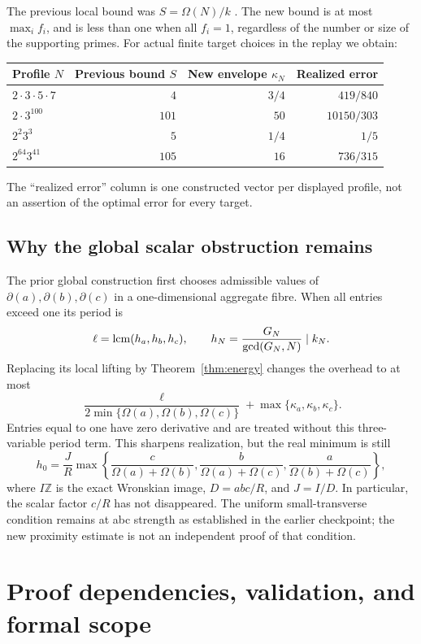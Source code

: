 \documentclass[11pt]{article}
\theoremstyle{definition}\newtheorem{definition}[theorem]{Definition}
\theoremstyle{remark}\newtheorem{remark}[theorem]{Remark}
\newcommand{\Z}{\mathbb Z}\newcommand{\N}{\mathbb N}\newcommand{\R}{\mathbb R}
\begin{document}
The previous local bound was $S=\Omega(N)/k$ \cite{transverse}. The new
bound is at most $\max_i f_i$, and is less than one when all $f_i=1$,
regardless of the number or size of the supporting primes. For actual
finite target choices in the replay we obtain:
\begin{center}
\begin{tabular}{lrrr}\toprule
Profile $N$ & Previous bound $S$ & New envelope $\kappa_N$ & Realized error\\\midrule
$2\cdot3\cdot5\cdot7$ & $4$ & $3/4$ & $419/840$\\
$2\cdot3^{100}$ & $101$ & $50$ & $10150/303$\\
$2^2 3^3$ & $5$ & $1/4$ & $1/5$\\
$2^{64}3^{41}$ & $105$ & $16$ & $736/315$\\\bottomrule
\end{tabular}
\end{center}
The ``realized error'' column is one constructed vector per displayed
profile, not an assertion of the optimal error for every target.

\subsection{Why the global scalar obstruction remains}
The prior global construction first chooses admissible values of
$\partial(a),\partial(b),\partial(c)$ in a one-dimensional aggregate
fibre. When all entries exceed one its period is
\[
\ell=\operatorname{lcm}(h_a,h_b,h_c),\qquad
h_N=\frac{G_N}{\gcd(G_N,N)}\mid k_N.
\]
Replacing its local lifting by Theorem~\ref{thm:energy} changes the overhead
to at most
\[
\frac{\ell}{2\min\{\Omega(a),\Omega(b),\Omega(c)\}}
+\max\{\kappa_a,\kappa_b,\kappa_c\}.
\]
Entries equal to one have zero derivative and are treated without this
three-variable period term. This sharpens realization, but the real
minimum is still
\[
h_0=\frac JR\max\left\{
\frac c{\Omega(a)+\Omega(b)},
\frac b{\Omega(a)+\Omega(c)},
\frac a{\Omega(b)+\Omega(c)}\right\},
\]
where $I\Z$ is the exact Wronskian image, $D=abc/R$, and $J=I/D$.
In particular, the scalar factor $c/R$ has not disappeared.
The uniform small-transverse condition remains at abc strength as established
in the earlier checkpoint; the new proximity estimate is not an independent
proof of that condition.

\section{Proof dependencies, validation, and formal scope}
\end{document}
